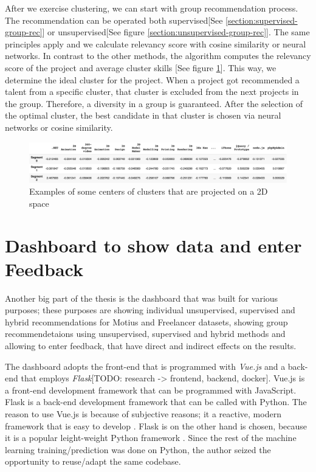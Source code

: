 After we exercise clustering, we can start with group recommendation process. The recommendation can be operated both supervised[See \ref{section:supervised-group-rec}] or unsupervised[See figure \ref{section:unsupervised-group-rec}]. The same principles apply and we calculate relevancy score with cosine similarity or neural networks. In contrast to the other methods, the algorithm computes the relevancy score of the project and average cluster skills [See figure \ref{fig:cluster-centers-matrix}]. This way, we determine the ideal cluster for the project. When a project got recommended a talent from a specific cluster, that cluster is excluded from the next projects in the group. Therefore, a diversity in a group is guaranteed. After the selection of the optimal cluster, the best candidate in that cluster is chosen via neural networks or cosine similarity.

 \begin{figure}[!ht]
	\centering
	\includegraphics[width=\textwidth]{figures/ClusterCentersMatrix.png}
	\caption{Examples of some centers of clusters that are projected on a 2D space}
	\label{fig:cluster-centers-matrix}
\end{figure}



\section{Dashboard to show data and enter Feedback}

Another big part of the thesis is the dashboard that was built for various purposes; these purposes are showing individual unsupervised, supervised and hybrid recommendations for Motius and Freelancer datasets, showing group recommendetaions using unsupervised, supervised and hybrid methods and allowing to enter feedback, that have direct and indirect effects on the results.

The dashboard adopts the front-end that is programmed with \textit{Vue.js} and a back-end that employs \textit{Flask}[TODO: research -> frontend, backend, docker]. Vue.js is a front-end development framework that can be programmed with JavaScript. Flask is a back-end development framework that can be called with Python. The reason to use Vue.js is because of subjective reasons; it a reactive, modern framework that is easy to develop \cite{you2018vue}. Flask is on the other hand is chosen, because it is a popular leight-weight Python framework \cite{grinberg2018flask}. Since the rest of the machine learning training/prediction was done on Python, the author seized the opportunity to reuse/adapt the same codebase. 

